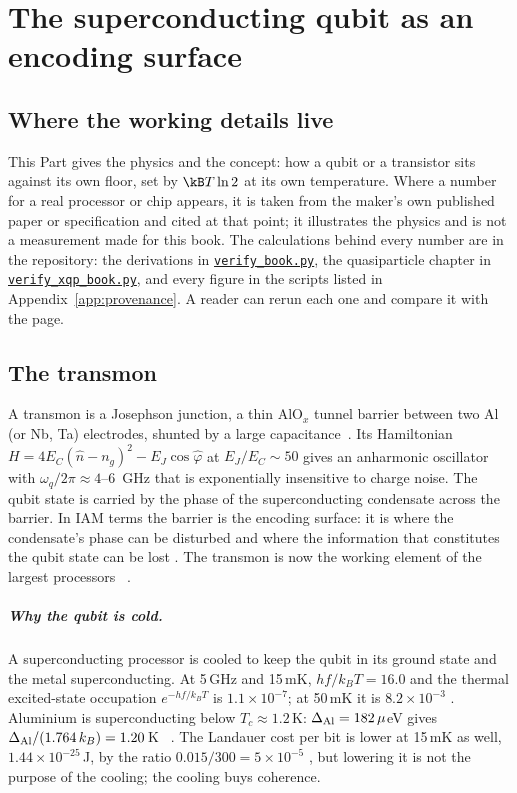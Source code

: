 \chapter{The superconducting qubit as an encoding surface}\label{ch:scprimer}


\section*{Where the working details live}
This Part gives the physics and the concept: how a qubit or a transistor sits against its own floor, set by $\kB T\ln2$ at its own
temperature. Where a number for a real processor or chip appears, it is taken from the maker's own published paper or specification and
cited at that point; it illustrates the physics and is not a measurement made for this book. The calculations behind every number are in the repository:
the derivations in \href{https://github.com/hmahaffeyges/IAM-Validation/blob/main/docs/book/verify_book.py}{\texttt{verify\_book.py}}, the quasiparticle chapter in
\href{https://github.com/hmahaffeyges/IAM-Validation/blob/main/docs/verification/scripts/verify_xqp_book.py}{\texttt{verify\_xqp\_book.py}}, and every figure in the scripts listed in
Appendix~\ref{app:provenance}. A reader can rerun each one and compare it with the page.

\section{The transmon}

A transmon is a Josephson junction, a thin AlO$_x$ tunnel barrier between two Al (or Nb, Ta)
electrodes, shunted by a large capacitance~\cite{Koch2007}. Its Hamiltonian
$H=4E_C(\hat n-n_g)^2-E_J\cos\hat\varphi$ at $E_J/E_C\sim50$ gives an anharmonic oscillator
with $\omega_q/2\pi\approx4$--$6$~GHz that is exponentially insensitive to charge noise. The
qubit state is carried by the phase of the superconducting condensate across the barrier.
In IAM terms the barrier is the encoding surface: it is where the condensate's phase can be
disturbed and where the information that constitutes the qubit state can be lost \interp. The
transmon is now the working element of the largest processors~\cite{Arute2019,GoogleWillow2025,Kim2023IBM} \observed.

\paragraph{Why the qubit is cold.} A superconducting processor is cooled to keep the qubit in its ground state and the metal superconducting.
At 5\,GHz and 15\,mK, $hf/k_BT=16.0$ and the thermal excited-state occupation $e^{-hf/k_BT}$ is $1.1\times10^{-7}$; at 50\,mK it is $8.2\times10^{-3}$
\calc. Aluminium is superconducting below $T_c\approx1.2$\,K: $\Delta_{\rm Al}=182\,\mu$eV gives $\Delta_{\rm Al}/(1.764\,k_B)=1.20$\,K \calc~\cite{Blais2021}.
The Landauer cost per bit is lower at 15\,mK as well, $1.44\times10^{-25}$\,J, by the ratio $0.015/300=5\times10^{-5}$ \calc, but lowering it is
not the purpose of the cooling; the cooling buys coherence. \interp

